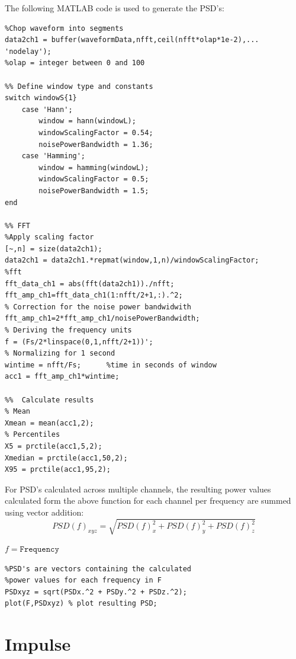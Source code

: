 \documentclass[11pt]{report}
\begin{document}
The following MATLAB code is used to generate the PSD's:

\begin{lstlisting}
%Chop waveform into segments
data2ch1 = buffer(waveformData,nfft,ceil(nfft*olap*1e-2),...
'nodelay');
%olap = integer between 0 and 100

%% Define window type and constants
switch windowS{1}
	case 'Hann';
    	window = hann(windowL);
		windowScalingFactor = 0.54;
		noisePowerBandwidth = 1.36;
	case 'Hamming';
		window = hamming(windowL);
		windowScalingFactor = 0.5;
		noisePowerBandwidth = 1.5;
end
    
%% FFT
%Apply scaling factor
[~,n] = size(data2ch1);
data2ch1 = data2ch1.*repmat(window,1,n)/windowScalingFactor;
%fft
fft_data_ch1 = abs(fft(data2ch1))./nfft;
fft_amp_ch1=fft_data_ch1(1:nfft/2+1,:).^2;
% Correction for the noise power bandwidwith
fft_amp_ch1=2*fft_amp_ch1/noisePowerBandwidth;
% Deriving the frequency units
f = (Fs/2*linspace(0,1,nfft/2+1))';
% Normalizing for 1 second
wintime = nfft/Fs;      %time in seconds of window
acc1 = fft_amp_ch1*wintime;
        
%%  Calculate results
% Mean
Xmean = mean(acc1,2);    
% Percentiles
X5 = prctile(acc1,5,2);
Xmedian = prctile(acc1,50,2);
X95 = prctile(acc1,95,2);
\end{lstlisting}

For PSD's calculated across multiple channels, the resulting power values calculated form the above function for each channel per frequency are summed using vector addition: \\

$$PSD(f)_{xyz} = \sqrt{PSD(f)_x^2 + PSD(f)_y^2 + PSD(f)_z^2}$$

\begin{flushright}
$f = \mathtt{Frequency}$
\end{flushright}

\begin{lstlisting}
%PSD's are vectors containing the calculated 
%power values for each frequency in F
PSDxyz = sqrt(PSDx.^2 + PSDy.^2 + PSDz.^2);
plot(F,PSDxyz) % plot resulting PSD;
\end{lstlisting}

\section{Impulse}
\end{document}
